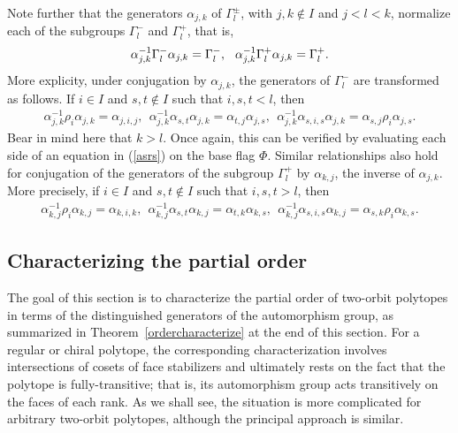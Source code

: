 \documentclass[12pt]{article}
\renewcommand{\>}{\rangle}
\newcommand{\qq}{\hspace{.15cm}}
\theoremstyle{definition}\newtheorem{definition}{Definition}[section]
\begin{document}
Note further that the generators $\alpha_{j,k}$ of $\Gamma_l^{\pm}$, with $j,k\notin I$ and $j<l<k$, normalize each of the subgroups $\Gamma_l^{-}$ and $\Gamma_l^{+}$, that is,
\begin{eqnarray}
\alpha_{j,k}^{-1}\Gamma_l^{-} \alpha_{j,k} = \Gamma_l^{-}, \;\qq \alpha_{j,k}^{-1}\Gamma_l^{+} \alpha_{j,k} = \Gamma_l^{+}.
\end{eqnarray}
More explicity, under conjugation by $\alpha_{j,k}$, the generators of $\Gamma_l^{-}$ are transformed as follows. If $i\in I$ and $s,t \notin I$ such that $i,s,t<l$, then 
\begin{eqnarray} 
\label{asrs}
\alpha_{j,k}^{-1}\rho_i\alpha_{j,k}=\alpha_{j,i,j}, \ \
\alpha_{j,k}^{-1}\alpha_{s,t}\alpha_{j,k}= \alpha_{t,j}\alpha_{j,s}, \ \
\alpha_{j,k}^{-1}\alpha_{s,i,s}\alpha_{j,k}=\alpha_{s,j}\rho_i\alpha_{j,s}.
\end{eqnarray}
Bear in mind here that $k>l$. Once again, this can be verified by evaluating each side of an equation in (\ref{asrs}) on the base flag $\Phi$. Similar relationships also hold for conjugation of the generators of the subgroup $\Gamma_l^{+}$ by $\alpha_{k,j}$, the inverse of $\alpha_{j,k}$. More precisely, if $i\in I$ and $s,t \notin I$ such that $i,s,t>l$, then 
\begin{eqnarray} 
\label{asrsinv}
\alpha_{k,j}^{-1}\rho_i\alpha_{k,j}=\alpha_{k,i,k}, \ \
\alpha_{k,j}^{-1}\alpha_{s,t}\alpha_{k,j}= \alpha_{t,k}\alpha_{k,s}, \ \
\alpha_{k,j}^{-1}\alpha_{s,i,s}\alpha_{k,j}=\alpha_{s,k}\rho_i\alpha_{k,s}.
\end{eqnarray}

\subsection{Characterizing the partial order}
\label{sec:order}

The goal of this section is to characterize the partial order of two-orbit polytopes in terms of the distinguished generators of the automorphism group, as summarized in Theorem~\ref{ordercharacterize} at the end of this section. For a regular or chiral polytope, the corresponding characterization involves intersections of cosets of face stabilizers and ultimately rests on the fact that the polytope is fully-transitive; that is, its automorphism group acts transitively on the faces of each rank. As we shall see, the situation is more complicated for arbitrary two-orbit polytopes, although the principal approach is similar. 
\end{document}
